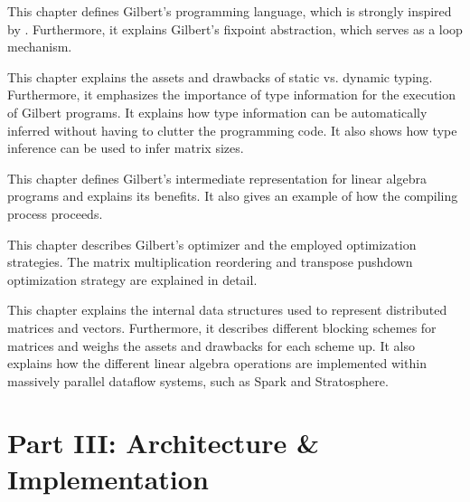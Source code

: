 
\noindent This chapter defines Gilbert's programming language, which is strongly inspired by \matlab. 
Furthermore, it explains Gilbert's fixpoint abstraction, which serves as a loop mechanism.

\vspace{3mm}


\noindent This chapter explains the assets and drawbacks of static vs. dynamic typing.
Furthermore, it emphasizes the importance of type information for the execution of Gilbert programs. 
It explains how type information can be automatically inferred without having to clutter the programming code.
It also shows how type inference can be used to infer matrix sizes.

\vspace{3mm}


\noindent This chapter defines Gilbert's intermediate representation for linear algebra programs and explains its benefits.
It also gives an example of how the compiling process proceeds.

\vspace{3mm}


\noindent This chapter describes Gilbert's optimizer and the employed optimization strategies.
The matrix multiplication reordering and transpose pushdown optimization strategy are explained in detail.

 \vspace{10mm}


\noindent This chapter explains the internal data structures used to represent distributed matrices and vectors.
Furthermore, it describes different blocking schemes for matrices and weighs the assets and drawbacks for each scheme up.
It also explains how the different linear algebra operations are implemented within massively parallel dataflow systems, such as Spark and Stratosphere.

\vspace{3mm}

\section*{Part III: Architecture \& Implementation}

